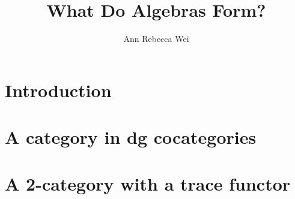 \documentclass[12pt, draft]{nuthesis} %
\author{Ann Rebecca Wei}
\title{What Do Algebras Form?}
\theoremstyle{definition}
\theoremstyle{remark}
\theoremstyle{example}
\begin{document}

\frontmatter		%
\maketitle		%

\abstract		%


\acknowledgements	%





\nomenclature %


%
%
\clearpage{} %
\tableofcontents	%

\clearpage{} %
\listoftables		%

\listoffigures		%



\mainmatter             %

\chapter{Introduction}
	

\chapter{A category in dg cocategories} \label{chap:cat_in_dgcocats}
	
	
	

\chapter{A 2-category with a trace functor} \label{chap:2cat_trace}
	
	
	
\end{document}
